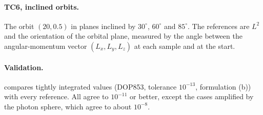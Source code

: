 \paragraph{TC6, inclined orbits.} The orbit $(20, 0.5)$ in planes inclined by $30^\circ$,
$60^\circ$ and $85^\circ$. The references are $L^2$ and the orientation of the orbital plane,
measured by the angle between the angular-momentum vector $(L_x, L_y, L_z)$ at each sample and
at the start.

\paragraph{Validation.}  compares tightly integrated values (DOP853, tolerance
$10^{-13}$, formulation (b)) with every reference. All agree to $10^{-11}$ or better, except
the cases amplified by the photon sphere, which agree to about $10^{-8}$.

\begin{table}[t]
\caption{\label{tab:validation}Validation (T2): DOP853 at tolerance $10^{-13}$ in formulation
(b) against the exact references. The last row compares with the value listed by the
predecessor project, \texttt{schwarzschild-geodesics}: its ``analytic'' 2.127093985 was
evaluated at the smallest sampled radius rather than the true periapsis. The exact value,
from the closed form and a 40-digit quadrature, is 2.12709400813.}
\centering\footnotesize

\end{table}
